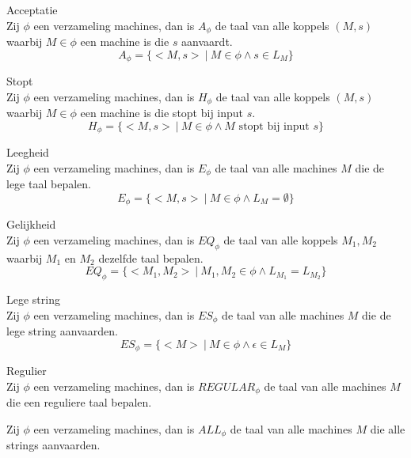 \documentclass[main.tex]{subfiles}
\begin{document}
\begin{de}
  Acceptatie\\
  Zij $\phi$ een verzameling machines, dan is $A_{\phi}$ de taal van alle koppels $(M,s)$ waarbij $M\in \phi$ een machine is die $s$ aanvaardt.
  \[ A_{\phi} = \{ <M,s> \ |\ M\in \phi \wedge s \in L_{M} \} \]
\end{de}

\begin{de}
  Stopt\\
  Zij $\phi$ een verzameling machines, dan is $H_{\phi}$ de taal van alle koppels $(M,s)$ waarbij $M\in \phi$ een machine is die stopt bij input $s$.
  \[ H_{\phi} = \{ <M,s> \ |\ M \in \phi \wedge M \text{ stopt bij input } s \} \]
\end{de}

\begin{de}
  Leegheid\\
  Zij $\phi$ een verzameling machines, dan is $E_{\phi}$ de taal van alle machines $M$ die de lege taal bepalen.
  \[ E_{\phi} = \{ <M,s>\ |\ M \in \phi \wedge L_{M} = \emptyset \} \]
\end{de}

\begin{de}
  Gelijkheid\\
  Zij $\phi$ een verzameling machines, dan is $EQ_{\phi}$ de taal van alle koppels $M_{1},M_{2}$ waarbij $M_{1}$ en $M_{2}$ dezelfde taal bepalen.
  \[ EQ_{\phi} = \{ <M_{1},M_{2}> \ |\ M_{1},M_{2} \in \phi \wedge L_{M_{1}} = L_{M_{2}} \} \]
\end{de}

\begin{de}
  Lege string\\
  Zij $\phi$ een verzameling machines, dan is $ES_{\phi}$ de taal van alle machines $M$ die de lege string aanvaarden.
  \[ ES_{\phi} = \{ <M> \ |\ M\in \phi \wedge \epsilon \in L_{M}\} \]
\end{de}

\begin{de}
  Regulier\\
  Zij $\phi$ een verzameling machines, dan is $REGULAR_{\phi}$ de taal van alle machines $M$ die een reguliere taal bepalen.
\end{de}

\begin{de}
  Zij $\phi$ een verzameling machines, dan is $ALL_{\phi}$ de taal van alle machines $M$ die alle strings aanvaarden.
\end{de}
\end{document}

